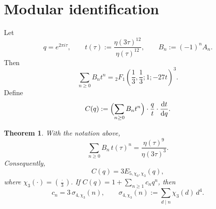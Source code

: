 \documentclass[11pt]{amsart}
\newtheorem{theorem}{Theorem}[section]
\theoremstyle{remark}
\newcommand{\dd}{\mathrm{d}}
\begin{document}
\section{Modular identification}\label{sec:modular}

Let
\[
q=e^{2\pi i\tau},
\qquad
t(\tau):=\frac{\eta(3\tau)^{12}}{\eta(\tau)^{12}},
\qquad
B_n:=(-1)^nA_n.
\]
Then
\[
\sum_{n\ge 0} B_n t^n
={}_2F_1\!\left(\frac13,\frac13;1;-27t\right)^3.
\]
Define
\[
C(q):=\Bigl(\sum_{n\ge 0} B_n t^n\Bigr)\cdot\frac{q}{t}\cdot\frac{\dd t}{\dd q}.
\]

\begin{theorem}\label{thm:modular}
With the notation above,
\begin{equation}\label{eq:mod-id}
\sum_{n\ge 0} B_n\, t(\tau)^n
=
\frac{\eta(\tau)^9}{\eta(3\tau)^3}.
\end{equation}
Consequently,
\begin{equation}\label{eq:C-eisenstein}
C(q)=3E_{5,\chi_0,\chi_3}(q),
\end{equation}
where $\chi_3(\cdot)=\left(\frac{\cdot}{3}\right)$.
If $C(q)=1+\sum_{n\ge 1} c_n q^n$, then
\begin{equation}\label{eq:c-divisor-sum}
c_n = 3\,\sigma_{4,\chi_3}(n),
\qquad
\sigma_{4,\chi_3}(n):=\sum_{d\mid n}\chi_3(d)\,d^4.
\end{equation}
\end{theorem}
\end{document}
